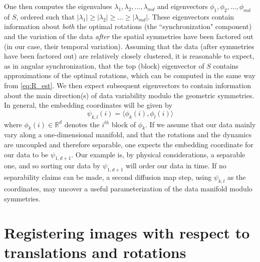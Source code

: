 \documentclass{pnastwo}
\begin{document}
\begin{article}
\begin{materials}
One then computes the eigenvalues $\lambda_1, \lambda_2, \dots, \lambda_{md}$ and eigenvectors $\phi_1, \phi_2, \dots, \phi_{md}$ of $S$, ordered such that $|\lambda_1| \ge |\lambda_2| \ge \dots \ge |\lambda_{md}|$.
%
These eigenvectors contain information about {\em both} the optimal rotations (the ``synchronization" component) and the
variation of the data {\em after} the spatial symmetries have been factored out (in our case, their temporal variation).
%
Assuming that the data (after symmetries have been factored out) are relatively closely clustered, it is reasonable
to expect, as in angular synchronization, that the top (block) eigenvector of $S$ contains approximations of the optimal rotations,
which can be computed in the same way from \eqref{eq:R_est}.
%
We then expect subsequent eigenvectors to contain information about the main direction(s) of data variability modulo the geometric symmetries.
%
In general, the embedding coordinates will be given by
\begin{equation}
\psi_{k,l} (i) = \langle \phi_k(i), \phi_l(i) \rangle
\end{equation}
where $\phi_k(i) \in \mathbb{R}^d$ denotes the $i^{th}$ block of $\phi_k$.
%
If we assume that our data mainly vary along a one-dimensional manifold, and that the rotations and the dynamics are uncoupled and therefore separable, one expects the embedding coordinate for our data %
to be  $\psi_{1,d+1}$.
%
Our example is, by physical considerations, a separable one, and so sorting our data by $\psi_{1,d+1}$ will order our data in time.
%
If no separability claims can be made, a second diffusion map step, using $\psi_{k,l}$ as the coordinates, may uncover a
useful parameterization of the data manifold modulo symmetries.

\section{Registering images with respect to translations and rotations} \label{subsec:trans_rot_register}


\end{materials}
\end{article}
\end{document}
